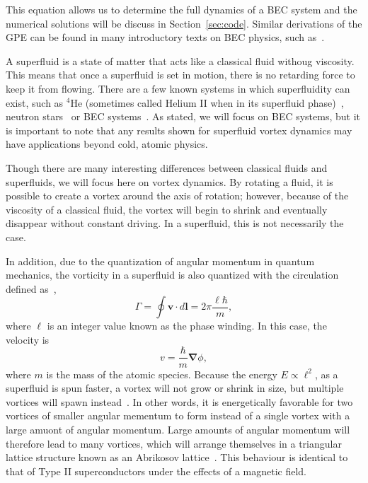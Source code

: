 This equation allows us to determine the full dynamics of a BEC system and the numerical solutions will be discuss in Section~\ref{sec:code}. Similar derivations of the GPE can be found in many introductory texts on BEC physics, such as~\cite{Fetter2003,  Pethick2002, Fetter2009}.


A superfluid is a state of matter that acts like a classical fluid withoug viscosity.
This means that once a superfluid is set in motion, there is no retarding force to keep it from flowing.
There are a few known systems in which superfluidity can exist, such as $^4$He (sometimes called Helium II when in its superfluid phase)~\cite{Allen1938}, neutron stars~\cite{Migdal1960} or BEC systems~\cite{Einstein1925, Anderson1995}.
As stated, we will focus on BEC systems, but it is important to note that any results shown for superfluid vortex dynamics may have applications beyond cold, atomic physics.

Though there are many interesting differences between classical fluids and superfluids, we will focus here on vortex dynamics.
By rotating a fluid, it is possible to create a vortex around the axis of rotation; however, because of the viscosity of a classical fluid, the vortex will begin to shrink and eventually disappear without constant driving.
In a superfluid, this is not necessarily the case.

In addition, due to the quantization of angular momentum in quantum mechanics, the vorticity in a superfluid is also quantized with the circulation defined as~\cite{Pethick2002},
\begin{equation}
\Gamma = \oint\mathbf{v} \cdot d \mathbf{l} = 2\pi \frac{\ell \hbar}{m},
\label{Eq:phase}
\end{equation}
where $\ell$ is an integer value known as the phase winding.
In this case, the velocity is
\begin{equation}
v = \frac{\hbar}{m}\mathbf{\nabla}\phi,
\end{equation}
where $m$ is the mass of the atomic species.
Because the energy $E \propto \ell^2$, as a superfluid is spun faster, a vortex will not grow or shrink in size, but multiple vortices will spawn instead~\cite{Pethick2002}.
In other words, it is energetically favorable for two vortices of smaller angular mementum to form instead of a single vortex with a large amuont of angular momentum.
Large amounts of angular momentum will therefore lead to many vortices, which will arrange themselves in a triangular lattice structure known as an Abrikosov lattice~\cite{Abrikosov1957, Fetter2001}.
This behaviour is identical to that of Type II superconductors under the effects of a magnetic field.

